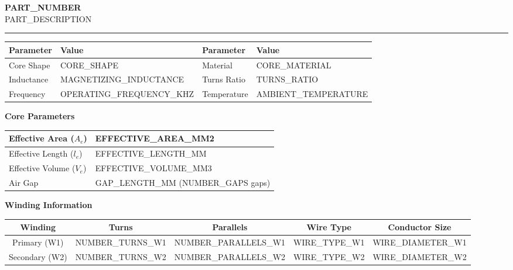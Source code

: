 \documentclass[10pt,a4paper]{article}
\begin{document}
\noindent
{\LARGE\bfseries\textcolor{headerblue}{{{PART_NUMBER}}}} \\[3mm]
{\large {{PART_DESCRIPTION}}} \\[2mm]
\hrule height 1pt
\vspace{5mm}

\begin{center}
\begin{tabular}{|l|l||l|l|}
\hline
\rowcolor{gray!20}
\textbf{Parameter} & \textbf{Value} & \textbf{Parameter} & \textbf{Value} \\
\hline
Core Shape & {{CORE_SHAPE}} & Material & {{CORE_MATERIAL}} \\
\hline
Inductance & {{MAGNETIZING_INDUCTANCE}} & Turns Ratio & {{TURNS_RATIO}} \\
\hline
Frequency & {{OPERATING_FREQUENCY_KHZ}} & Temperature & {{AMBIENT_TEMPERATURE}} \\
\hline
\end{tabular}
\end{center}

\vspace{5mm}

\noindent\textbf{\textcolor{headerblue}{Core Parameters}}
\vspace{2mm}

\begin{tabular}{|l|l|}
\hline
Effective Area ($A_e$) & {{EFFECTIVE_AREA_MM2}} \\
\hline
Effective Length ($l_e$) & {{EFFECTIVE_LENGTH_MM}} \\
\hline
Effective Volume ($V_e$) & {{EFFECTIVE_VOLUME_MM3}} \\
\hline
Air Gap & {{GAP_LENGTH_MM}} ({{NUMBER_GAPS}} gaps) \\
\hline
\end{tabular}

\vspace{5mm}

\noindent\textbf{\textcolor{headerblue}{Winding Information}}
\vspace{2mm}

\begin{tabular}{|c|c|c|c|c|}
\hline
\rowcolor{gray!20}
\textbf{Winding} & \textbf{Turns} & \textbf{Parallels} & \textbf{Wire Type} & \textbf{Conductor Size} \\
\hline
Primary (W1) & {{NUMBER_TURNS_W1}} & {{NUMBER_PARALLELS_W1}} & {{WIRE_TYPE_W1}} & {{WIRE_DIAMETER_W1}} \\
\hline
Secondary (W2) & {{NUMBER_TURNS_W2}} & {{NUMBER_PARALLELS_W2}} & {{WIRE_TYPE_W2}} & {{WIRE_DIAMETER_W2}} \\
\hline
\end{tabular}
\end{document}
